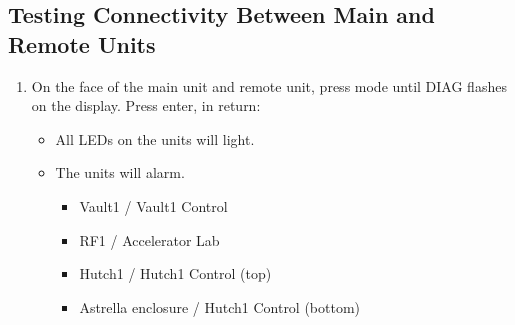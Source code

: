 \documentclass[letterpaper,10pt,english]{sphinxmanual}
\begin{document}
\subsection{Testing Connectivity Between Main and Remote Units}
\label{\detokenize{testing_documentation/O2_testing:testing-connectivity-between-main-and-remote-units}}\begin{enumerate}
%
\item {} 
\sphinxAtStartPar
On the face of the main unit and remote unit, press mode until DIAG flashes on the display. Press enter, in return:
\begin{itemize}
\item {} 
\sphinxAtStartPar
All LEDs on the units will light.

\item {} 
\sphinxAtStartPar
The units will alarm.
\begin{itemize}
\item {} 
\sphinxAtStartPar
Vault\sphinxhyphen{}1 / Vault\sphinxhyphen{}1 Control

\item {} 
\sphinxAtStartPar
RF\sphinxhyphen{}1 / Accelerator Lab

\item {} 
\sphinxAtStartPar
Hutch\sphinxhyphen{}1 / Hutch\sphinxhyphen{}1 Control (top)

\item {} 
\sphinxAtStartPar
Astrella enclosure / Hutch\sphinxhyphen{}1 Control (bottom)

\end{itemize}

\end{itemize}

\end{enumerate}
\end{document}
